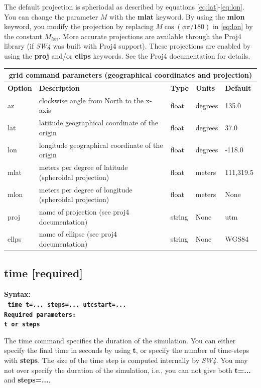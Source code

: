 \documentclass[11pt]{report}
\begin{document}
The default projection is spheriodal as described by equations \eqref{eq:lat}-\eqref{eq:lon}. You
can change the parameter $M$ with the {\bf mlat} keyword. By using the {\bf mlon} keyword, you
modify the projection by replacing $M\cos(\phi\pi/180)$ in \eqref{eq:lon} by the constant
$M_{lon}$. More accurate projections are available through the Proj4 library (if \emph{SW4} was
built with Proj4 support). These projections are enabled by using the {\bf proj} and/or {\bf ellps}
keywords. See the Proj4 documentation for details.
\begin{center}
\begin{tabular}{|l|p{8cm}|l|l|l|} \hline
\multicolumn{5}{|c|}{\bf grid command parameters (geographical coordinates and projection)}\\ \hline
\bf{Option} & \bf{Description} & \bf{Type} & \bf{Units} & \bf{Default}\\ \hline \hline
az & clockwise angle from North to the x-axis & float & degrees & 135.0 \\ \hline
lat & latitude geographical coordinate of the origin & float & degrees & 37.0 \\ \hline
lon & longitude geographical coordinate of the origin & float & degrees & -118.0 \\ \hline
mlat & meters per degree of latitude (spheroidal projection) & float & meters & 111,319.5 \\ \hline
mlon & meters per degree of longitude (spheroidal projection) & float & meters & None \\ \hline
proj & name of  projection (see proj4 documentation) & string & None & utm \\ \hline
ellps & name of ellipse (see proj4 documentation) & string & None & WGS84 \\ \hline
\end{tabular}
\end{center}

\subsection{time [required]}
\begin{flushleft}
\bf Syntax:\\
\tt
time t=... steps=... utcstart=...\\
\bf Required parameters:\\
\tt t \rm or \tt steps
\end{flushleft}
The time command specifies the duration of the simulation. You can either specify the final time in
seconds by using {\bf t}, or specify the number of time-steps with {\bf steps}.  The size of the
time step is computed internally by \emph{SW4}. You may not over specify the duration of the
simulation, i.e., you can not give both {\bf t=...} and {\bf steps=...}.
\end{document}
